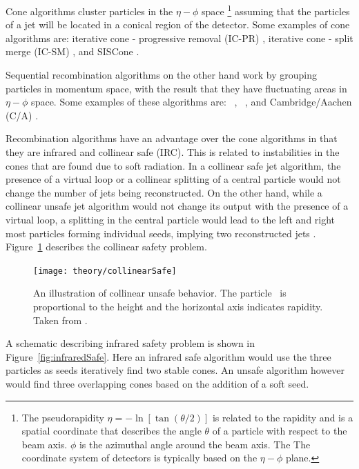 Cone algorithms cluster particles in the $\eta-\phi$ space \footnote{The pseudorapidity $\eta = -\ln [\tan(\theta/2)]$ is related to the rapidity and is a spatial coordinate that describes the angle $\theta$ of a particle with respect to the beam axis. $\phi$ is the azimuthal angle around the beam axis. The The coordinate system of detectors is typically based on the $\eta-\phi$ plane.} assuming that the particles of a jet will be located in a conical region of the detector.
Some examples of cone algorithms are: iterative cone - progressive removal (IC-PR) \cite{ARNISON1983214}, iterative cone - split merge (IC-SM) \cite{Blazey:2000qt}, and SISCone \cite{Salam_2007}.

Sequential recombination algorithms on the other hand work by grouping particles in momentum space, with the result that they have fluctuating areas in $\eta-\phi$ space.
Some examples of these algorithms are: \kt\ \cite{Catani:1993hr}, \antikt\ \cite{Cacciari:2008gp}, and Cambridge/Aachen (C/A) \cite{Dokshitzer:1997in}.

Recombination algorithms have an advantage over the cone algorithms in that they are infrared and collinear safe (IRC).
This is related to instabilities in the cones that are found due to soft radiation.
In a collinear safe jet algorithm, the presence of a virtual loop or a collinear splitting of a central particle would not change the number of jets being reconstructed.
On the other hand, while a collinear unsafe jet algorithm would not change its output with the presence of a virtual loop, a splitting in the central particle would lead to the left and right most particles forming individual seeds, implying two reconstructed jets \cite{Salam:2009jx}.
Figure~\ref{fig:collinearSafe} describes the collinear safety problem.

\begin{figure}[htp]
\centering
\texttt{[image: theory/collinearSafe]}
\caption{An illustration of collinear unsafe behavior.
The particle \pt\ is proportional to the height and the horizontal axis indicates rapidity.
Taken from \cite{Salam:2009jx}.}
\label{fig:collinearSafe}
\end{figure}

A schematic describing infrared safety problem is shown in Figure~\ref{fig:infraredSafe}.
Here an infrared safe algorithm would use the three particles as seeds iteratively find two stable cones.
An unsafe algorithm however would find three overlapping cones based on the addition of a soft seed.

